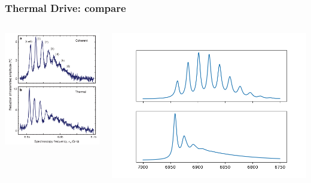 \documentclass[xcolor=dvipsnames,hyperref={CJKbookmarks=true}]{beamer}
\begin{document}
\begin{frame}[t]\frametitle{Thermal Drive: compare}
\begin{columns}
\begin{column}{0.4\linewidth}
    \centering
    \includegraphics[width=\linewidth]{thermal_origin.png}
\end{column}%
\begin{column}{0.6\linewidth}
	\centering
    \includegraphics[width=\linewidth]{thermal.png}

\end{column}
\end{columns}
\end{frame}
\end{document}
